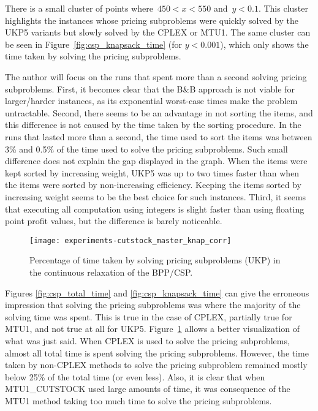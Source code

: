 There is a small cluster of points where~\(450 < x < 550\) and~\(y < 0.1\).
This cluster highlights the instances whose pricing subproblems were quickly solved by the UKP5 variants but slowly solved by the CPLEX or MTU1.
The same cluster can be seen in Figure~\ref{fig:csp_knapsack_time} (for \(y < 0.001\)), which only shows the time taken by solving the pricing subproblems.


The author will focus on the runs that spent more than a second solving pricing subproblems.%
First, it becomes clear that the B\&B approach is not viable for larger/harder instances, as its exponential worst-case times make the problem untractable.
Second, there seems to be an advantage in not sorting the items, and this difference is not caused by the time taken by the sorting procedure.
In the runs that lasted more than a second, the time used to sort the items was between 3\% and 0.5\% of the time used to solve the pricing subproblems.
Such small difference does not explain the gap displayed in the graph.
When the items were kept sorted by increasing weight, UKP5 was up to two times faster than when the items were sorted by non-increasing efficiency.
Keeping the items sorted by increasing weight seems to be the best choice for such instances.
Third, it seems that executing all computation using integers is slight faster than using floating point profit values, but the difference is barely noticeable.

\begin{figure}[h]
\caption{Percentage of time taken by solving pricing subproblems (UKP) in the continuous relaxation of the BPP/CSP.}
\begin{center}
\texttt{[image: experiments-cutstock\_master\_knap\_corr]}
\end{center}
\label{fig:percentage_knap_subproblem}
\end{figure}

Figures \ref{fig:csp_total_time} and \ref{fig:csp_knapsack_time} can give the erroneous impression that solving the pricing subproblems was where the majority of the solving time was spent.
This is true in the case of CPLEX, partially true for MTU1, and not true at all for UKP5.
Figure~\ref{fig:percentage_knap_subproblem} allows a better visualization of what was just said.
When CPLEX is used to solve the pricing subproblems, almost all total time is spent solving the pricing subproblems.
However, the time taken by non-CPLEX methods to solve the pricing subproblem remained mostly below 25\% of the total time (or even less).
Also, it is clear that when MTU1\_CUTSTOCK used large amounts of time, it was consequence of the MTU1 method taking too much time to solve the pricing subproblems.

